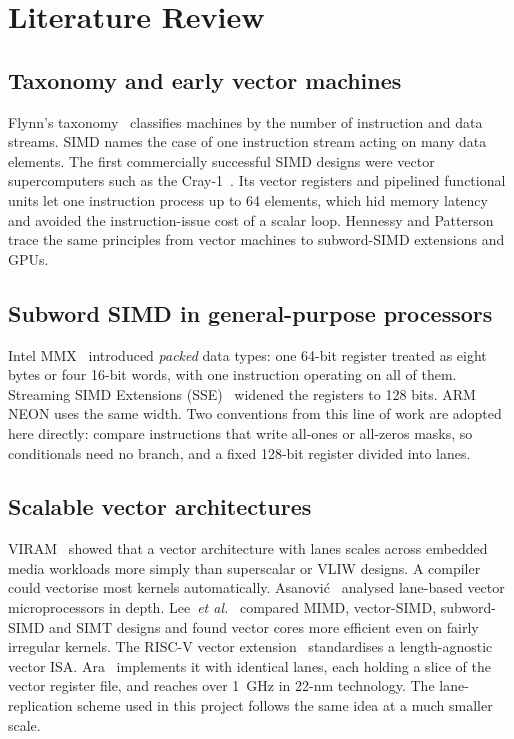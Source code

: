 \documentclass[conference]{IEEEtran}
\begin{document}
\section{Literature Review}

\subsection{Taxonomy and early vector machines}
Flynn's taxonomy~\cite{flynn72} classifies machines by the number of instruction
and data streams. SIMD names the case of one instruction stream acting on many data
elements. The first commercially successful SIMD designs were vector supercomputers
such as the Cray-1~\cite{cray1}. Its vector registers and pipelined functional units
let one instruction process up to 64 elements, which hid memory latency and avoided
the instruction-issue cost of a scalar loop. Hennessy and Patterson~\cite{hp6} trace
the same principles from vector machines to subword-SIMD extensions and GPUs.

\subsection{Subword SIMD in general-purpose processors}
Intel MMX~\cite{mmx} introduced \emph{packed} data types: one 64-bit register
treated as eight bytes or four 16-bit words, with one instruction operating on all
of them. Streaming SIMD Extensions (SSE)~\cite{sse} widened the registers to 128
bits. ARM NEON uses the same width. Two conventions from this line of work are
adopted here directly: compare instructions that write all-ones or all-zeros masks,
so conditionals need no branch, and a fixed 128-bit register divided into lanes.

\subsection{Scalable vector architectures}
VIRAM~\cite{viram} showed that a vector architecture with lanes scales across
embedded media workloads more simply than superscalar or VLIW designs. A compiler
could vectorise most kernels automatically. Asanovi\'c~\cite{asanovic98} analysed
lane-based vector microprocessors in depth. Lee~\emph{et al.}~\cite{maven} compared
MIMD, vector-SIMD, subword-SIMD and SIMT designs and found vector cores more
efficient even on fairly irregular kernels. The RISC-V vector extension~\cite{rvv}
standardises a length-agnostic vector ISA. Ara~\cite{ara} implements it with
identical lanes, each holding a slice of the vector register file, and reaches over
\SI{1}{GHz} in 22-nm technology. The lane-replication scheme used in this project
follows the same idea at a much smaller scale.
\end{document}
